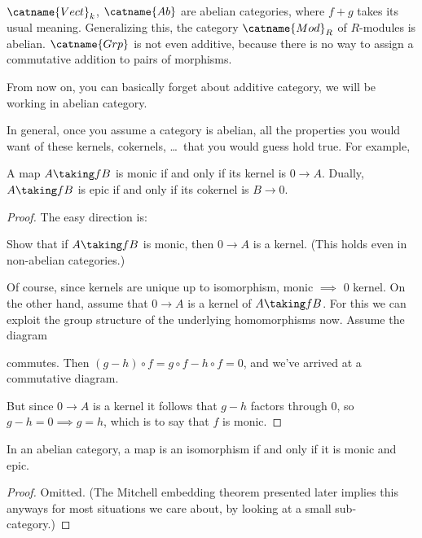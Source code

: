 \begin{example}
	\listhack
	\begin{enumerate}[(a)]
		\ii $\catname{Vect}_k$, $\catname{Ab}$ are abelian categories,
		where $f+g$ takes its usual meaning.
		\ii Generalizing this, the category $\catname{Mod}_R$ of $R$-modules is abelian.
		\ii $\catname{Grp}$ is not even additive, because there is no way to assign
		a commutative addition to pairs of morphisms.
	\end{enumerate}
\end{example}

From now on, you can basically forget about additive category, we will be working in abelian
category.

In general, once you assume a category is abelian, all the properties you would want
of these kernels, cokernels, \dots\ that you would guess hold true.
For example,
\begin{proposition}
	A map $A \taking f B$ is monic if and only if its kernel is $0 \to A$.
	Dually, $A \taking f B$ is epic if and only if its cokernel is $B \to 0$.
\end{proposition}
\begin{proof}
	The easy direction is:
	\begin{exercise}
		Show that if $A \taking f B$ is monic, then $0 \to A$ is a kernel.
		(This holds even in non-abelian categories.)
	\end{exercise}
	Of course, since kernels are unique up to isomorphism, monic $\implies$ $0$ kernel.
	On the other hand, assume that $0 \to A$ is a kernel of $A \taking f B$.
	For this we can exploit the group structure of the underlying homomorphisms now.
	Assume the diagram
	\begin{center}
	\end{center}
	commutes.
	Then $(g - h) \circ f = g \circ f - h \circ f = 0$, and we've arrived at a commutative diagram.
	\begin{center}
	\end{center}
	But since $0 \to A$ is a kernel it follows that $g-h$ factors through $0$,
	so $g-h = 0 \implies g = h$, which is to say that $f$ is monic.
\end{proof}
\begin{proposition}
	In an abelian category,
	a map is an isomorphism if and only if it is monic and epic.
\end{proposition}
\begin{proof}
	Omitted. (The Mitchell embedding theorem
	presented later implies this anyways for
	most situations we care about,
	by looking at a small sub-category.)
\end{proof}

